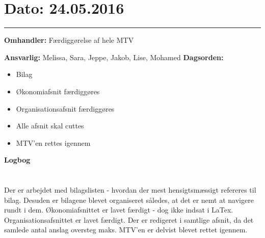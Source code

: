 \section{Dato: 24.05.2016}
\hrule

\textbf{Omhandler:} Færdiggørelse af hele MTV

\textbf{Ansvarlig:} Melissa, Sara, Jeppe, Jakob, Lise, Mohamed
\textbf{Dagsorden:}
\begin{itemize}
	\item Bilag
	\item Økonomiafsnit færdiggøres 
	\item Organisationsafsnit færdiggøres
	\item Alle afsnit skal  cuttes
	\item MTV'en rettes igennem
	
\end{itemize}

\textbf{Logbog}
\\
\\ \\
Der er arbejdet med bilagslisten - hvordan der mest hensigtsmæssigt refereres til bilag. Desuden er bilagene blevet organiseret således, at det er nemt at navigere rundt i dem. 
Økonomiafsnittet er lavet færdigt - dog ikke indsat i LaTex. 
Organisationsafsnittet er lavet færdigt. 
Der er redigeret i samtlige afsnit, da det samlede antal anslag oversteg maks. 
MTV'en er delvist blevet rettet igennem. 
